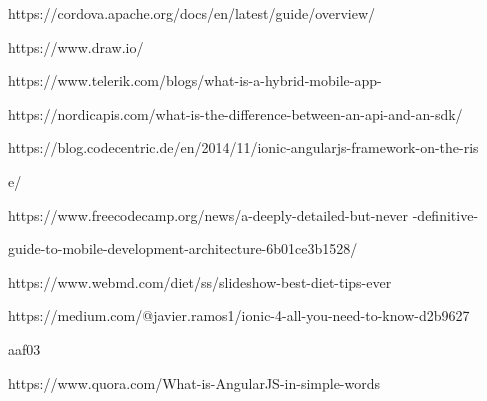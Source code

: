\documentclass[a4paper,12pt]{article}
\begin{document}
			https://cordova.apache.org/docs/en/latest/guide/overview/

			https://www.draw.io/

			https://www.telerik.com/blogs/what-is-a-hybrid-mobile-app-
			
			https://nordicapis.com/what-is-the-difference-between-an-api-and-an-sdk/ 
			
			https://blog.codecentric.de/en/2014/11/ionic-angularjs-framework-on-the-ris
			
			e/
			
			https://www.freecodecamp.org/news/a-deeply-detailed-but-never
			-definitive-

			guide-to-mobile-development-architecture-6b01ce3b1528/
			
			https://www.webmd.com/diet/ss/slideshow-best-diet-tips-ever
			
			https://medium.com/@javier.ramos1/ionic-4-all-you-need-to-know-d2b9627
			
			aaf03

			https://www.quora.com/What-is-AngularJS-in-simple-words
			
			
\end{document}
